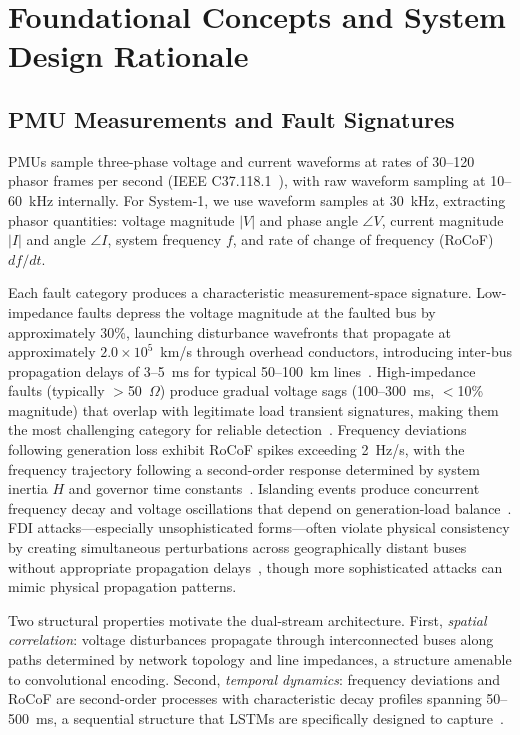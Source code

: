 \documentclass[journal]{IEEEtran}
\begin{document}
\section{Foundational Concepts and System Design Rationale}
\label{sec:foundations}

\subsection{PMU Measurements and Fault Signatures}

PMUs sample three-phase voltage and current waveforms at rates of 30--120 phasor frames per second (IEEE C37.118.1~\cite{ref4}), with raw waveform sampling at 10--60~kHz internally. For System-1, we use waveform samples at 30~kHz, extracting phasor quantities: voltage magnitude $|V|$ and phase angle $\angle V$, current magnitude $|I|$ and angle $\angle I$, system frequency $f$, and rate of change of frequency (RoCoF) $df/dt$.

Each fault category produces a characteristic measurement-space signature. Low-impedance faults depress the voltage magnitude at the faulted bus by approximately 30\%, launching disturbance wavefronts that propagate at approximately $2.0\!\times\!10^5$~km/s through overhead conductors, introducing inter-bus propagation delays of 3--5~ms for typical 50--100~km lines~\cite{ref17}. High-impedance faults (typically $>$50~$\Omega$) produce gradual voltage sags (100--300~ms, $<$10\% magnitude) that overlap with legitimate load transient signatures, making them the most challenging category for reliable detection~\cite{ref18}. Frequency deviations following generation loss exhibit RoCoF spikes exceeding 2~Hz/s, with the frequency trajectory following a second-order response determined by system inertia $H$ and governor time constants~\cite{ref19}. Islanding events produce concurrent frequency decay and voltage oscillations that depend on generation-load balance~\cite{ref20}. FDI attacks---especially unsophisticated forms---often violate physical consistency by creating simultaneous perturbations across geographically distant buses without appropriate propagation delays~\cite{ref13}, though more sophisticated attacks can mimic physical propagation patterns.

Two structural properties motivate the dual-stream architecture. First, \emph{spatial correlation}: voltage disturbances propagate through interconnected buses along paths determined by network topology and line impedances, a structure amenable to convolutional encoding. Second, \emph{temporal dynamics}: frequency deviations and RoCoF are second-order processes with characteristic decay profiles spanning 50--500~ms, a sequential structure that LSTMs are specifically designed to capture~\cite{ref10,ref21}.
\end{document}
